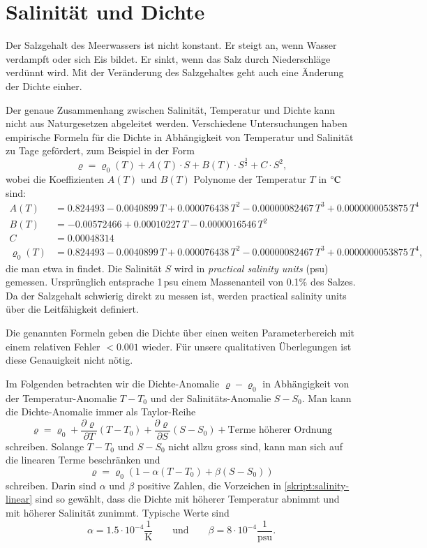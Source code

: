 %
%
%
\section{Salinität und Dichte}
Der Salzgehalt des Meerwassers ist nicht konstant.
Er steigt an, wenn Wasser verdampft oder sich Eis bildet.
Er sinkt, wenn das Salz durch Niederschläge verdünnt wird.
Mit der Veränderung des Salzgehaltes geht auch eine Änderung
der Dichte einher.

Der genaue Zusammenhang zwischen Salinität, Temperatur und Dichte
kann nicht aus Naturgesetzen abgeleitet werden.
Verschiedene Untersuchungen haben empirische Formeln für die
Dichte in Abhängigkeit von Temperatur und Salinität zu Tage
gefördert,
zum Beispiel in der Form
\[
\varrho
=
\varrho_0(T)
+
A(T)\cdot S + B(T)\cdot S^{\frac32}+C\cdot S^2,
\]
wobei die Koeffizienten $A(T)$ und $B(T)$ Polynome der Temperatur $T$ in
$\mathstrut^\circ\text{C}$ sind:
\begin{align*}
A(T)
&=
 0.824493 - 0.0040899\,T + 0.000076438\,T^2 - 0.00000082467\,T^3 + 0.0000000053875\,T^4
\\
B(T)
&=
 -0.00572466 + 0.00010227\,T - 0.0000016546\,T^2
\\
C
&=
0.00048314
\\
\varrho_0(T)
&=
 0.824493 - 0.0040899\,T + 0.000076438\,T^2
 - 0.00000082467\,T^3 + 0.0000000053875\,T^4,
\end{align*}
die man etwa in
\cite{skript:millero}
findet.
Die Salinität $S$ wird in {\em practical salinity units} (psu) gemessen.
Ursprünglich entsprache 1\,psu einem Massenanteil von 0.1\%
des Salzes. 
Da der Salzgehalt schwierig direkt zu messen ist, werden practical salinity
units über die Leitfähigkeit definiert.
%
%

Die genannten Formeln geben die Dichte über einen weiten Parameterbereich
mit einem relativen Fehler $<0.001$ wieder.
Für unsere qualitativen Überlegungen ist diese Genauigkeit
nicht nötig.

Im Folgenden betrachten wir die Dichte-Anomalie $\varrho-\varrho_0$
in Abhängigkeit von der Temperatur-Anomalie $T-T_0$ und der
Salinitäts-Anomalie $S-S_0$.
Man kann die Dichte-Anomalie immer als Taylor-Reihe
\[
\varrho 
=
\varrho_0
+
\frac{\partial \varrho}{\partial T}(T-T_0)
+
\frac{\partial \varrho}{\partial S}(S-S_0)
+
\text{Terme höherer Ordnung}
\]
schreiben.
Solange $T-T_0$ und $S-S_0$ nicht allzu gross sind, kann man sich auf
die linearen Terme beschränken und
\begin{equation}
\varrho
=
\varrho_0(1-\alpha(T-T_0)+\beta(S-S_0))
\label{skript:salinity-linear}
\end{equation}
schreiben.
Darin sind $\alpha$ und $\beta$ positive Zahlen, die Vorzeichen in
\eqref{skript:salinity-linear} sind so gewählt, dass die Dichte
mit höherer Temperatur abnimmt und mit höherer Salinität zunimmt.
Typische Werte sind
\[
\alpha = 1.5\cdot 10^{-4}\frac{1}{\text{K}}
\qquad
\text{und}
\qquad
\beta = 8\cdot 10^{-4}\frac{1}{\text{psu}}.
\]

